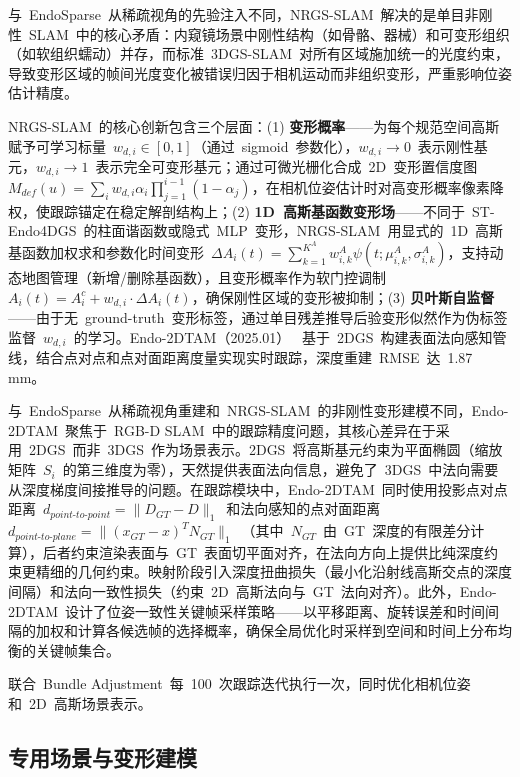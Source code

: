 与~EndoSparse~从稀疏视角的先验注入不同，NRGS-SLAM~解决的是单目非刚性~SLAM~中的核心矛盾：内窥镜场景中刚性结构（如骨骼、器械）和可变形组织（如软组织蠕动）并存，而标准~3DGS-SLAM~对所有区域施加统一的光度约束，导致变形区域的帧间光度变化被错误归因于相机运动而非组织变形，严重影响位姿估计精度。

NRGS-SLAM~的核心创新包含三个层面：(1) \textbf{变形概率}——为每个规范空间高斯赋予可学习标量~$w_{d,i} \in [0,1]$（通过~sigmoid~参数化），$w_{d,i} \to 0$~表示刚性基元，$w_{d,i} \to 1$~表示完全可变形基元；通过可微光栅化合成~2D~变形置信度图~$M_{def}(u) = \sum_i w_{d,i} \alpha_i \prod_{j=1}^{i-1}(1-\alpha_j)$，在相机位姿估计时对高变形概率像素降权，使跟踪锚定在稳定解剖结构上；(2) \textbf{1D~高斯基函数变形场}——不同于~ST-Endo4DGS~的柱面谐函数或隐式~MLP~变形，NRGS-SLAM~用显式的~1D~高斯基函数加权求和参数化时间变形~$\Delta A_i(t) = \sum_{k=1}^{K^A} w_{i,k}^A \psi(t; \mu_{i,k}^A, \sigma_{i,k}^A)$，支持动态地图管理（新增/删除基函数），且变形概率作为软门控调制~$A_i(t) = A_i^c + w_{d,i} \cdot \Delta A_i(t)$，确保刚性区域的变形被抑制；(3) \textbf{贝叶斯自监督}——由于无~ground-truth~变形标签，通过单目残差推导后验变形似然作为伪标签监督~$w_{d,i}$~的学习。Endo-2DTAM（2025.01）~\cite{2501_19319} 基于~2DGS~构建表面法向感知管线，结合点对点和点对面距离度量实现实时跟踪，深度重建~RMSE~达~1.87 mm。

与~EndoSparse~从稀疏视角重建和~NRGS-SLAM~的非刚性变形建模不同，Endo-2DTAM~聚焦于~RGB-D SLAM~中的跟踪精度问题，其核心差异在于采用~2DGS~而非~3DGS~作为场景表示。2DGS~将高斯基元约束为平面椭圆（缩放矩阵~$S_i$~的第三维度为零），天然提供表面法向信息，避免了~3DGS~中法向需要从深度梯度间接推导的问题。在跟踪模块中，Endo-2DTAM~同时使用投影点对点距离~$d_{point\text{-}to\text{-}point} = \|D_{GT} - D\|_1$~和法向感知的点对面距离~$d_{point\text{-}to\text{-}plane} = \|(x_{GT} - x)^T N_{GT}\|_1$~（其中~$N_{GT}$~由~GT~深度的有限差分计算），后者约束渲染表面与~GT~表面切平面对齐，在法向方向上提供比纯深度约束更精细的几何约束。映射阶段引入深度扭曲损失（最小化沿射线高斯交点的深度间隔）和法向一致性损失（约束~2D~高斯法向与~GT~法向对齐）。此外，Endo-2DTAM~设计了位姿一致性关键帧采样策略——以平移距离、旋转误差和时间间隔的加权和计算各候选帧的选择概率，确保全局优化时采样到空间和时间上分布均衡的关键帧集合。

联合~Bundle Adjustment~每~100~次跟踪迭代执行一次，同时优化相机位姿和~2D~高斯场景表示。

\subsection{专用场景与变形建模}
\label{ss:19_2}

